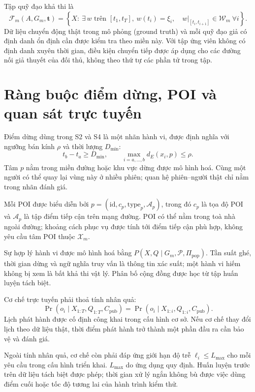 \documentclass[12pt,a4paper,oneside]{report}
\begin{document}
Tập quỹ đạo khả thi là
\begin{equation}
\mathcal F_m(A,G_m,\mathbf t)
=\left\{X:\ \exists\,w\text{ trên }[t_1,t_T],\
w(t_i)=\xi_i,\quad
w|_{[t_i,t_{i+1}]}\in\mathcal W_m\ \forall i\right\}.
\label{eq:urban-feasible}
\end{equation}
Dữ liệu chuyển động thật trong mô phỏng (ground truth) và mỗi quỹ đạo giả có định danh ổn định cần được kiểm tra theo miền này. Với tập ứng viên không có định danh xuyên thời gian, điều kiện chuyển tiếp được áp dụng cho các đường nối giả thuyết của đối thủ, không theo thứ tự các phần tử trong tập.

\section{Ràng buộc điểm dừng, POI và quan sát trực tuyến}

Điểm dừng dùng trong S2 và S4 là một nhãn hành vi, được định nghĩa với ngưỡng bán kính $\rho$ và thời lượng $D_{\min}$:
\[
t_b-t_a\ge D_{\min},\qquad
\max_{i=a,\ldots,b} d_E(x_i,p)\le\rho.
\]
Tâm $p$ nằm trong miền đường hoặc khu vực dừng được mô hình hoá. Cùng một người có thể quay lại vùng này ở nhiều phiên; quan hệ phiên--người thật chỉ nằm trong nhãn đánh giá.

Mỗi POI được biểu diễn bởi $p=(\mathrm{id},c_p,\mathrm{type}_p,\mathcal A_p)$, trong đó $c_p$ là tọa độ POI và $\mathcal A_p$ là tập điểm tiếp cận trên mạng đường. POI có thể nằm trong toà nhà ngoài đường; khoảng cách phục vụ được tính tới điểm tiếp cận phù hợp, không yêu cầu tâm POI thuộc $\mathcal X_m$.

Sự hợp lý hành vi được mô hình hoá bằng $P(X,Q\mid G_m,\mathcal P,\Pi_{\mathrm{pop}})$. Tần suất ghé, thời gian dừng và ngữ nghĩa truy vấn là thông tin xác suất; một hành vi hiếm không bị xem là bất khả thi vật lý. Phân bố cộng đồng được học từ tập huấn luyện tách biệt.

Cơ chế trực tuyến phải thoả tính nhân quả:
\[
\Pr(o_i\mid X_{1:T},Q_{1:T},C_{\mathrm{pub}})
=\Pr(o_i\mid X_{1:i},Q_{1:i},C_{\mathrm{pub}}).
\]
Lịch phát hành được cố định công khai trong cấu hình cơ sở. Nếu cơ chế thay đổi lịch theo dữ liệu thật, thời điểm phát hành trở thành một phần đầu ra cần bảo vệ và đánh giá.

Ngoài tính nhân quả, cơ chế còn phải đáp ứng giới hạn độ trễ $\ell_i\le L_{\max}$ cho mỗi yêu cầu trong cấu hình triển khai. $L_{\max}$ do ứng dụng quy định. Huấn luyện trước trên dữ liệu tách biệt được phép; thời gian xử lý ngắn không bù được việc dùng điểm cuối hoặc tốc độ tương lai của hành trình kiểm thử.
\end{document}

